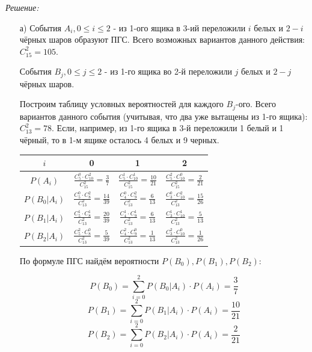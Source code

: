 \textit{Решение:}

\begin{enumerate}
	\item[а)] События $A_i, 0 \le i \le 2$ - из 1-ого ящика в 3-ий переложили $i$ белых и $2-i$ чёрных шаров образуют ПГС. Всего возможных вариантов данного действия: $C_{15}^2 = 105$.
	
	События $B_j, 0 \le j \le 2$ - из 1-го ящика во 2-й переложили $j$ белых и $2-j$ чёрных шаров.
	
	Построим таблицу условных вероятностей для каждого $B_j$-ого. Всего вариантов данного события (учитывая, что два уже вытащены из 1-го ящика): $C_{13}^2 = 78$. Если, например, из 1-го ящика в 3-й переложили 1 белый и 1 чёрный, то в 1-м ящике осталось 4 белых и 9 черных.
	
	\begin{table}[h]
		\centering\makegapedcells
		\begin{tabular}{|c|c|c|c|}
			\hline
			$i$          & 0                                                      & 1                                                       & 2                                                       \\ \hline
			$P(A_i)$     & $\frac{C_5^0 \cdot C_{10}^2}{C_{15}^2} = \frac{3}{7}$  & $\frac{C_5^1 \cdot C_{10}^1}{C_{15}^2} = \frac{10}{21}$ & $\frac{C_5^2 \cdot C_{10}^0}{C_{15}^2} = \frac{2}{21}$  \\ \hline
			$P(B_0|A_i)$ & $\frac{C_5^0 \cdot C_{8}^2}{C_{13}^2} = \frac{14}{39}$ & $\frac{C_4^0 \cdot C_{9}^2}{C_{13}^2} = \frac{6}{13}$   & $\frac{C_3^0 \cdot C_{10}^2}{C_{13}^2} = \frac{15}{26}$ \\ \hline
			$P(B_1|A_i)$ & $\frac{C_5^1 \cdot C_{8}^1}{C_{13}^2} = \frac{20}{39}$ & $\frac{C_4^1 \cdot C_{9}^1}{C_{13}^2} = \frac{6}{13}$   & $\frac{C_3^1 \cdot C_{10}^1}{C_{13}^2} = \frac{5}{13}$  \\ \hline
			$P(B_2|A_i)$ & $\frac{C_5^2 \cdot C_{8}^0}{C_{13}^2} = \frac{5}{39}$  & $\frac{C_4^2 \cdot C_{9}^0}{C_{13}^2} = \frac{1}{13}$   & $\frac{C_3^2 \cdot C_{10}^0}{C_{13}^2} = \frac{1}{26}$  \\ \hline
		\end{tabular}
	\end{table}
	
	По формуле ПГС найдём вероятности $P(B_0), P(B_1), P(B_2)$:
	
	\[ P(B_0) = \sum_{i=0}^{2} P(B_0|A_i) \cdot P(A_i) = \dfrac{3}{7} \]
	\[ P(B_1) = \sum_{i=0}^{2} P(B_1|A_i) \cdot P(A_i) = \dfrac{10}{21} \]
	\[ P(B_2) = \sum_{i=0}^{2} P(B_2|A_i) \cdot P(A_i) = \dfrac{2}{21} \]
	

\end{enumerate}
